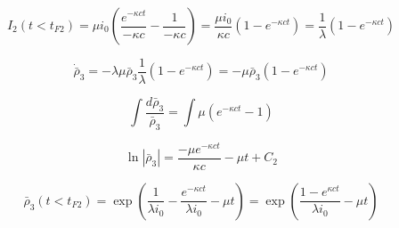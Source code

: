 \documentclass{article}
\begin{document}
\begin{equation}I_2(t<t_{F2}) = \mu i_0 \left( \frac{e^{-\kappa c t}}{-\kappa c} - \frac{1}{-\kappa c} \right) = \frac{\mu i_0}{\kappa c}\left(1 - e^{-\kappa c t}\right) = \frac{1}{\lambda}\left(1-e^{-\kappa c t}\right) \end{equation}

\begin{equation}\dot{\bar{\rho}}_3 = - \lambda \mu \bar{\rho}_3 \frac{1}{\lambda}\left(1 - e^{-\kappa c t}\right) =  - \mu \bar{\rho}_3\left(1 - e^{-\kappa c t}\right)\end{equation}

\begin{equation}\int \frac{d{\bar \rho_3}}{\bar \rho_3} = \int \mu ( e^{-\kappa c t} -1)\end{equation}

\begin{equation}\ln|\bar{\rho}_3| = \frac{- \mu e^{-\kappa c t}}{\kappa c} - \mu t + C_2\end{equation}

\begin{equation}\bar \rho_3(t<t_{F2}) = \exp\left( \frac{1}{\lambda i_0} - \frac{e^{-\kappa c t}}{\lambda i_0}-\mu t\right) = \exp\left(\frac{1-e^{\kappa c t}}{\lambda i_0} - \mu t \right)\end{equation}




\end{document}
